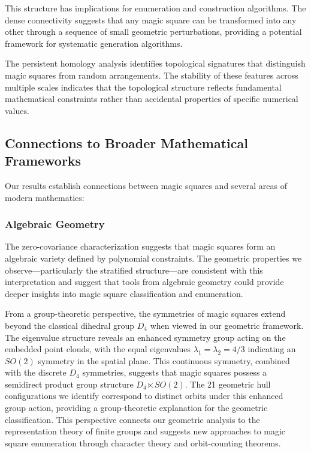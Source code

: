 This structure has implications for enumeration and construction algorithms. The dense connectivity suggests that any magic square can be transformed into any other through a sequence of small geometric perturbations, providing a potential framework for systematic generation algorithms.

The persistent homology analysis identifies topological signatures that distinguish magic squares from random arrangements. The stability of these features across multiple scales indicates that the topological structure reflects fundamental mathematical constraints rather than accidental properties of specific numerical values.

\subsection{Connections to Broader Mathematical Frameworks}

Our results establish connections between magic squares and several areas of modern mathematics:

\subsubsection{Algebraic Geometry}

The zero-covariance characterization suggests that magic squares form an algebraic variety defined by polynomial constraints. The geometric properties we observe—particularly the stratified structure—are consistent with this interpretation and suggest that tools from algebraic geometry could provide deeper insights into magic square classification and enumeration.

From a group-theoretic perspective, the symmetries of magic squares extend beyond the classical dihedral group $D_4$ when viewed in our geometric framework. The eigenvalue structure reveals an enhanced symmetry group acting on the embedded point clouds, with the equal eigenvalues $\lambda_1 = \lambda_2 = 4/3$ indicating an $SO(2)$ symmetry in the spatial plane. This continuous symmetry, combined with the discrete $D_4$ symmetries, suggests that magic squares possess a semidirect product group structure $D_4 \ltimes SO(2)$. The 21 geometric hull configurations we identify correspond to distinct orbits under this enhanced group action, providing a group-theoretic explanation for the geometric classification. This perspective connects our geometric analysis to the representation theory of finite groups and suggests new approaches to magic square enumeration through character theory and orbit-counting theorems.

